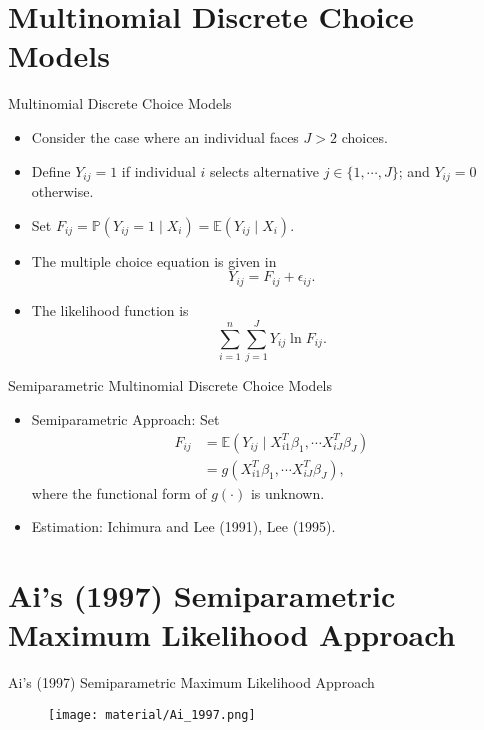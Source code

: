\documentclass[xcolor=svgnames,dvipdfmx,cjk]{beamer}
\theoremstyle{example}
\def\E{\mathbb{E}}
\def\P{\mathbb{P}}
\begin{document}
\section{Multinomial Discrete Choice Models}
  
\begin{frame}{Multinomial Discrete Choice Models}
\begin{itemize}
  \item Consider the case where an individual faces $J > 2$ choices.
  \item Define $Y_{ij} = 1$ if individual $i$ selects 
        alternative $j \in \{1, \cdots, J\}$; 
        and $Y_{ij}=0$ otherwise.
  \item Set $F_{ij} = \P(Y_{ij}=1 \mid X_i) =\E(Y_{ij} \mid X_i)$.
  \item The multiple choice equation is given in 
        \[Y_{ij} = F_{ij} + \epsilon_{ij}.\]
  \item The likelihood function is 
        \[\sum_{i=1}^n\sum_{j=1}^J Y_{ij} \ln F_{ij}.\]
\end{itemize}
\end{frame} 


\begin{frame}{Semiparametric Multinomial Discrete Choice Models}
\begin{itemize}
    \item \alert{Semiparametric Approach}: Set
          \begin{align*}
            F_{ij} &= \E(Y_{ij} \mid X_{i1}^T\beta_1, \cdots X_{iJ}^T\beta_J) \\
                   &= g(X_{i1}^T\beta_1, \cdots X_{iJ}^T\beta_J),
          \end{align*}
          where the functional form of $g(\cdot)$ is unknown.
    \item \alert{Estimation}:
          Ichimura and Lee (1991), Lee (1995).
\end{itemize}
\end{frame} 

\section{Ai's (1997) Semiparametric Maximum Likelihood Approach}
  
\begin{frame}{Ai's (1997) Semiparametric Maximum Likelihood Approach}
\begin{figure}
  \begin{center}
    \texttt{[image: material/Ai\_1997.png]}
  \end{center}
\end{figure}
\end{frame}  
  
\end{document}
